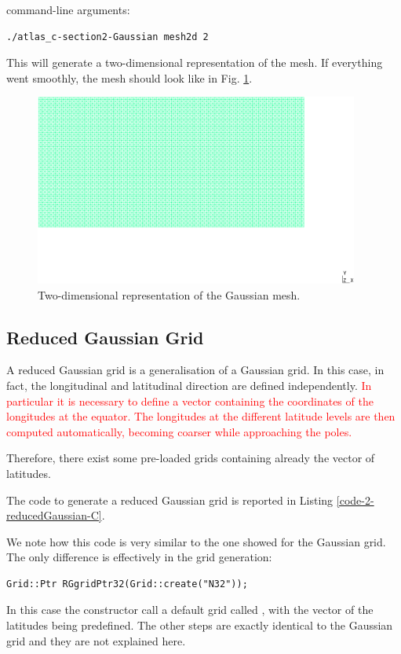 command-line arguments:
%
\begin{lstlisting}[style=BashStyle]
./atlas_c-section2-Gaussian mesh2d 2
\end{lstlisting}
% 
This will generate a two-dimensional representation of the mesh.
If everything went smoothly, the mesh should look like in Fig. 
\ref{fig:section2-Gaussian-2d}.
%
\begin{figure}[H]
  \centering
    \includegraphics[width=0.95\textwidth]{imgs/Gaussian_2d}
    \caption{Two-dimensional representation of the Gaussian mesh.}
    \label{fig:section2-Gaussian-2d}
\end{figure}
%


\subsection{Reduced Gaussian Grid}
A reduced Gaussian grid is a generalisation of a Gaussian grid. 
In this case, in fact, the longitudinal and latitudinal direction
are defined independently. \textcolor{red}{In particular it is 
necessary to define a vector containing the coordinates of the 
longitudes at the equator. The longitudes at the different latitude 
levels are then computed automatically, becoming coarser while 
approaching the poles.}

Therefore, there exist some pre-loaded grids containing already 
the vector of latitudes. 

The code to generate a reduced Gaussian grid is reported in 
Listing \ref{code-2-reducedGaussian-C}.
%

%
We note how this code is very similar to the one showed for the 
Gaussian grid. The only difference is effectively in the grid 
generation:
%
\begin{lstlisting}[style=CStyleNoLine]
Grid::Ptr RGgridPtr32(Grid::create("N32"));
\end{lstlisting}
%
In this case the constructor call a default grid called ,
with the vector of the latitudes being predefined. The other steps 
are exactly identical to the Gaussian grid and they are not explained 
here.

